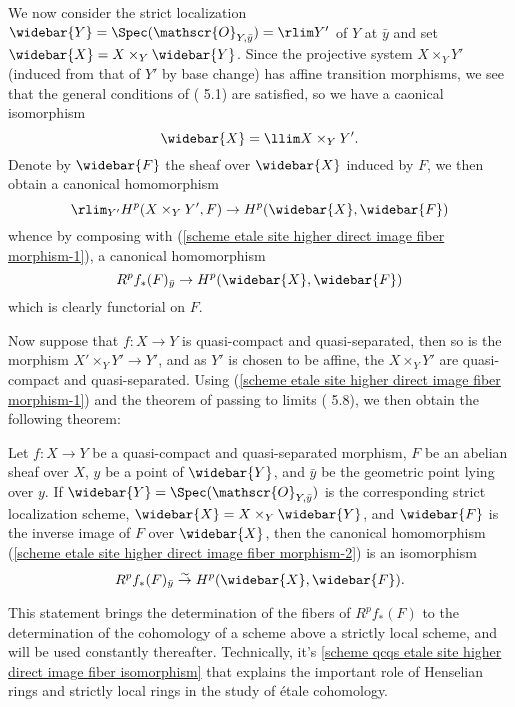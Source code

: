 We now consider the strict localization $\widebar{Y}=\Spec(\mathscr{O}_{Y,\bar{y}})=\rlim Y'$ of $Y$ at $\bar{y}$ and set $\widebar{X}=X\times_Y\widebar{Y}$. Since the projective system $X\times_YY'$ (induced from that of $Y'$ by base change) has affine transition morphisms, we see that the general conditions of (\cite{SGA4-2}  5.1) are satisfied, so we have a caonical isomorphism
\[\widebar{X}=\llim X\times_YY'.\]
Denote by $\widebar{F}$ the sheaf over $\widebar{X}$ induced by $F$, we then obtain a canonical homomorphism
\[\rlim_{Y'}H^p(X\times_YY',F)\to H^p(\widebar{X},\widebar{F})\]
whence by composing with (\ref{scheme etale site higher direct image fiber morphism-1}), a canonical homomorphism
\begin{equation}\label{scheme etale site higher direct image fiber morphism-2}
R^pf_*(F)_{\bar{y}}\to H^p(\widebar{X},\widebar{F})
\end{equation}
which is clearly functorial on $F$.\par
Now suppose that $f:X\to Y$ is quasi-compact and quasi-separated, then so is the morphism $X'\times_YY'\to Y'$, and as $Y'$ is chosen to be affine, the $X\times_YY'$ are quasi-compact and quasi-separated. Using (\ref{scheme etale site higher direct image fiber morphism-1}) and the theorem of passing to limits (\cite{SGA4-2}  5.8), we then obtain the following theorem:
\begin{theorem}\label{scheme qcqs etale site higher direct image fiber isomorphism}
Let $f:X\to Y$ be a quasi-compact and quasi-separated morphism, $F$ be an abelian sheaf over $X$, $y$ be a point of $\widebar{Y}$, and $\bar{y}$ be the geometric point lying over $y$. If $\widebar{Y}=\Spec(\mathscr{O}_{Y,\bar{y}})$ is the corresponding strict localization scheme, $\widebar{X}=X\times_Y\widebar{Y}$, and $\widebar{F}$ is the inverse image of $F$ over $\widebar{X}$, then the canonical homomorphism (\ref{scheme etale site higher direct image fiber morphism-2}) is an isomorphism
\[R^pf_*(F)_{\bar{y}}\stackrel{\sim}{\to} H^p(\widebar{X},\widebar{F}).\]
\end{theorem}

This statement brings the determination of the fibers of $R^pf_*(F)$ to the determination of the cohomology of a scheme above a strictly local scheme, and will be used constantly thereafter. Technically, it's \cref{scheme qcqs etale site higher direct image fiber isomorphism} that explains the important role of Henselian rings and strictly local rings in the study of \'etale cohomology.\par

